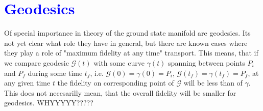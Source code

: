 \chapter{\textcolor{blue}{Geodesics}}
Of special importance in theory of the ground state manifold are geodesics. Its not yet clear what role they have in general, but there are known cases where they play a role of "maximum fidelity at any time" transport. This means, that if we compare geodesic $\mathcal{G}(t)$ with some curve $\gamma(t)$ spanning between points $P_i$ and $P_f$ during some time $t_f$, i.e. $\mathcal{G}(0)=\gamma(0)=P_i$, $\mathcal{G}(t_f)=\gamma(t_f)=P_f$, at any given time $t$ the fidelity on corresponding point of $\mathcal{G}$ will be less than of $\gamma$. This does not necesarilly mean, that the overall fidelity will be smaller for geodesics. WHYYYYY?????